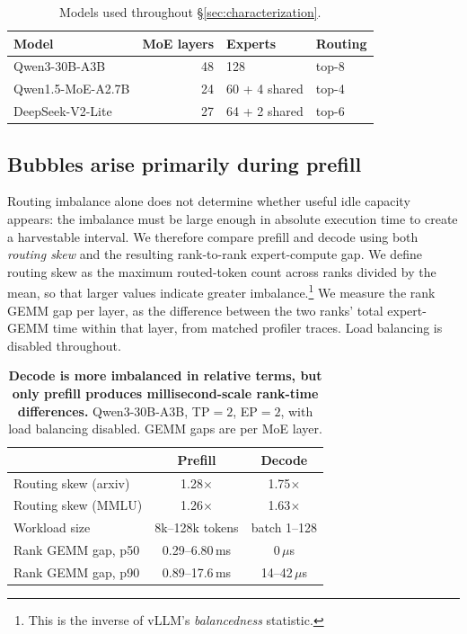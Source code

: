 \begin{table}[t]
  \centering
  \small
  \caption{Models used throughout \S\ref{sec:characterization}.}
  \label{tab}
  \begin{tabular}{lrll}
    \toprule
    Model & \ac{MoE} layers & Experts & Routing \\
    \midrule
    Qwen3-30B-A3B & 48 & 128 & top-8 \\
    Qwen1.5-MoE-A2.7B & 24 & 60 + 4 shared & top-4 \\
    DeepSeek-V2-Lite & 27 & 64 + 2 shared & top-6 \\
    \bottomrule
  \end{tabular}
\end{table}

\subsection{Bubbles arise primarily during prefill}
\label{sec:char-phase}

Routing imbalance alone does not determine whether useful idle capacity
appears: the imbalance must be large enough in absolute execution time to
create a harvestable interval. We therefore compare prefill and decode
using both \emph{routing skew} and the resulting rank-to-rank
expert-compute gap. We define routing skew as the maximum routed-token
count across ranks divided by the mean, so that larger values indicate
greater imbalance.\footnote{This is the inverse of vLLM's
\emph{balancedness} statistic.} We measure the rank \ac{GEMM} gap per
layer, as the difference between the two ranks' total expert-\ac{GEMM}
time within that layer, from matched profiler traces. Load balancing is
disabled throughout.

\begin{table}[t]
  \centering
  \small
  \caption{
    \textbf{Decode is more imbalanced in relative terms, but only prefill
    produces millisecond-scale rank-time differences.}
    Qwen3-30B-A3B, \ac{TP}$=2$, \ac{EP}$=2$, with load balancing disabled.
    \ac{GEMM} gaps are per \ac{MoE} layer.
  }
  \label{tab:phase}
  \begin{tabular}{lcc}
    \toprule
    & Prefill & Decode \\
    \midrule
    Routing skew (arxiv) & 1.28$\times$ & 1.75$\times$ \\
    Routing skew (MMLU)  & 1.26$\times$ & 1.63$\times$ \\
    \midrule
    Workload size
    & 8k--128k tokens
    & batch 1--128 \\
    Rank \ac{GEMM} gap, p50
    & 0.29--6.80\,ms
    & 0\,$\mu$s \\
    Rank \ac{GEMM} gap, p90
    & 0.89--17.6\,ms
    & 14--42\,$\mu$s \\
    \bottomrule
  \end{tabular}
\end{table}

